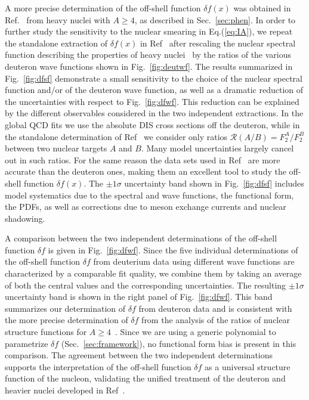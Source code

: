 \documentclass[%
      aps,
      prd,
      floatfix,
      preprintnumbers,
      preprint,
      showpacs,
      nofootinbib,
      tightenlines,
      amssymb,
      amsmath
]{revtex4-1}
\newcommand{\eq}[1]{Eq.(\ref{#1})}
\begin{document}
A more precise determination of the off-shell function $\delta f(x)$ was obtained in Ref.~\cite{KP04} 
from heavy nuclei with $A\geq 4$, as described in Sec.~\ref{sec:phen}. In order to further study 
the sensitivity to the nuclear smearing in \eq{eq:IA}, we repeat the standalone extraction of 
$\delta f(x)$ in Ref~\cite{KP04} after rescaling the nuclear spectral function describing the 
properties of heavy nuclei~\cite{KP04} by the ratios of the 
various deuteron wave functions shown in Fig.~\ref{fig:deutwf}. 
The results summarized in Fig.~\ref{fig:dfsf} demonstrate a small sensitivity to the 
choice of the nuclear spectral function and/or of the deuteron wave function, as well as 
a dramatic reduction of the uncertainties with respect to Fig.~\ref{fig:dfwf}.  
This reduction can be explained by the different observables 
considered in the two independent extractions. In the global QCD fits we use the absolute DIS 
cross sections off the deuteron, while in the standalone determination of Ref~\cite{KP04} 
we consider only {\rm ratios} $\mathcal R(A/B) = F_2^A/F_2^B$ between two nuclear targets $A$ and $B$. 
Many model uncertainties largely cancel out in such ratios. 
For the same reason the data sets used in Ref~\cite{KP04} 
are more accurate than the deuteron ones, making them an excellent tool to study 
the off-shell function $\delta f(x)$. The $\pm1 \sigma$ 
uncertainty band shown in Fig.~\ref{fig:dfsf} includes model systematics due to the  
spectral and wave functions, the functional form, the PDFs, as well as corrections due to 
meson exchange currents and nuclear shadowing. 

A comparison between the two independent determinations of the off-shell function $\delta f$ 
is given in Fig.~\ref{fig:dfwf}. 
Since the five individual determinations of the off-shell function $\delta f$ from 
deuterium data using different wave functions are characterized by a comparable fit quality, 
we combine them by taking an average of both the central values and the 
corresponding uncertainties. The resulting $\pm 1 \sigma$ uncertainty band is shown in the 
right panel of Fig.~\ref{fig:dfwf}.  
This band summarizes our determination of $\delta f$ from deuteron data  
and is consistent with the more precise determination of $\delta f$ from the analysis of the 
ratios of nuclear structure functions for $A\geq 4$~\cite{KP04}. 
Since we are using a generic polynomial to parametrize 
$\delta f$ (Sec.~\ref{sec:framework}), no functional form bias is present in this comparison.  
The agreement between the two independent determinations 
supports the interpretation of the off-shell function
$\delta f$ as a universal structure function of the nucleon, validating the unified treatment 
of the deuteron and heavier nuclei developed in Ref~\cite{KP04}. 
\end{document}
